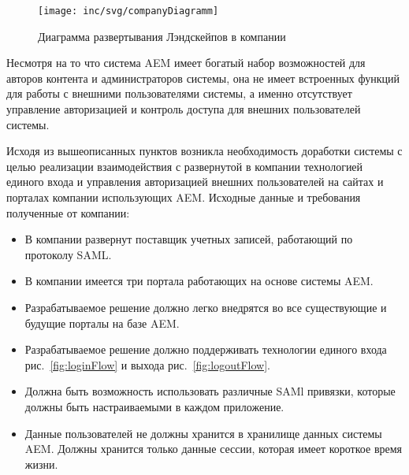 \begin{figure}[h]
  \centering
  \texttt{[image: inc/svg/companyDiagramm]}
  \caption{Диаграмма развертывания Лэндскейпов в компании}
  \label{fig:companyDiagramm}
\end{figure}

Несмотря на то что система AEM имеет богатый набор возможностей для авторов контента и администраторов системы, она не имеет встроенных функций для работы с внешними пользователями системы, а именно отсутствует управление авторизацией и контроль доступа для внешних пользователей системы.

Исходя из вышеописанных пунктов возникла необходимость доработки системы с целью реализации взаимодействия с развернутой в компании технологией единого входа и управления авторизацией внешних пользователей на сайтах и порталах компании использующих AEM. Исходные данные и требования полученные от компании: 
\begin{itemize} 
\item В компании развернут поставщик учетных записей, работающий по протоколу SAML.
\item В компании имеется три портала работающих на основе системы AEM.
\item Разрабатываемое решение должно легко внедрятся во все существующие и будущие порталы на базе AEM.
\item Разрабатываемое решение должно поддерживать технологии единого входа рис.~\ref{fig:loginFlow} и выхода рис.~\ref{fig:logoutFlow}.
\item Должна быть возможность использовать различные SAMl привязки, которые должны быть настраиваемыми в каждом приложение.
\item Данные пользователей не должны хранится в хранилище данных системы AEM. Должны хранится только данные сессии, которая имеет короткое время жизни.
\end{itemize}

%
%

